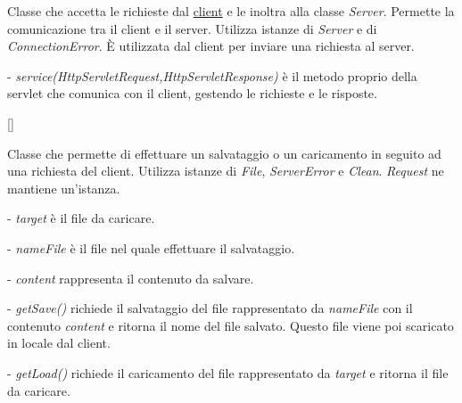 Classe che accetta le richieste dal \underline{client} e le inoltra alla classe \textit{Server}. Permette la comunicazione tra il client e il server.
Utilizza istanze di \textit{Server} e di \textit{ConnectionError}.
\`E utilizzata dal client per inviare una richiesta al server.
\begin{elencopuntato}[\subsubsecindent]
\item[-] \textit{service(HttpServletRequest,HttpServletResponse)} \`e il metodo proprio della servlet che comunica con il client, gestendo le richieste e le risposte. 
\end{elencopuntato}[\subsubsecindent]

Classe che permette di effettuare un salvataggio o un caricamento in seguito ad una richiesta del client.
Utilizza istanze di \textit{File}, \textit{ServerError} e \textit{Clean}.
\textit{Request} ne mantiene un'istanza.
\begin{elencopuntato}[\subsubsecindent]
\item[-] \textit{target} \`e il file da caricare.
\item[-] \textit{nameFile} \`e il file nel quale effettuare il salvataggio.
\item[-] \textit{content} rappresenta il contenuto da salvare.
\end{elencopuntato}
\begin{elencopuntato}[\subsubsecindent]
\item[-] \textit{getSave()} richiede il salvataggio del file rappresentato da \textit{nameFile} con il contenuto \textit{content} e ritorna il nome del file salvato. Questo file viene poi scaricato in locale dal client.
\item[-] \textit{getLoad()} richiede il caricamento del file rappresentato da \textit{target} e ritorna il file da caricare.
\end{elencopuntato}



